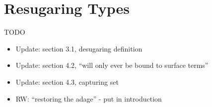 \chapter{Resugaring Types}\label{chap:resugar-type}

TODO
\begin{itemize}
\item Update: section 3.1, desugaring definition
\item Update: section 4.2, ``will only ever be bound to surface terms''
\item Update: section 4.3, capturing set
\item RW: ``restoring the adage'' - put in introduction
\end{itemize}
